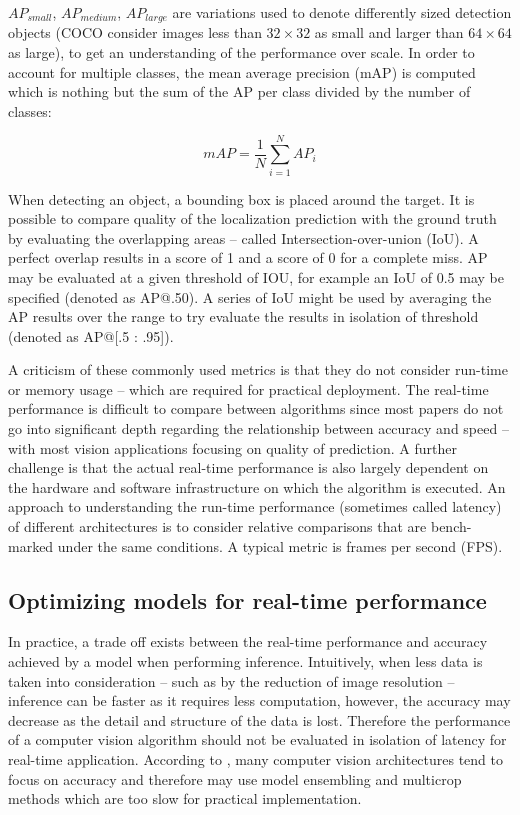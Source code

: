 \documentclass[a4paper,twoside,12pt]{report}
\begin{document}
$AP_{small}$, $AP_{medium}$, $AP_{large}$ are variations used to denote differently sized detection objects (COCO consider images less than $32 \times 32$ as small and larger than $64 \times 64$ as large), to get an understanding of the performance over scale. In order to account for multiple classes, the mean average precision (mAP) is computed which is nothing but the sum of the AP per class divided by the number of classes:

\begin{equation}
mAP = \frac{1}{N}\sum_{i=1}^{N} AP_{i}
\end{equation}

When detecting an object, a bounding box is placed around the target. It is possible to compare quality of the localization prediction with the ground truth by evaluating the overlapping areas -- called Intersection-over-union (IoU). A perfect overlap results in a score of 1 and a score of 0 for a complete miss. AP may be evaluated at a given threshold of IOU, for example an IoU of 0.5 may be specified (denoted as AP@.50). A series of IoU might be used by averaging the AP results over the range to try evaluate the results in isolation of threshold (denoted as AP@[.5 : .95]).  \citep{pmetrics}

A criticism of these commonly used metrics is that they do not consider run-time or memory usage -- which are required for practical deployment. The real-time performance is difficult to compare between algorithms since most papers do not go into significant depth regarding the relationship between accuracy and speed \citep{speedacc} -- with most vision applications focusing on quality of prediction. A further challenge is that the actual real-time performance is also largely dependent on the hardware and software infrastructure on which the algorithm is executed. An approach to understanding the run-time performance (sometimes called latency) of different architectures is to consider relative comparisons that are bench-marked under the same conditions. A typical metric is frames per second (FPS).

\newpage
\subsection{Optimizing models for real-time performance}

In practice, a trade off exists between the real-time performance and accuracy achieved by a model when performing inference. Intuitively, when less data is taken into consideration -- such as by the reduction of image resolution -- inference can be faster as it requires less computation, however, the accuracy may decrease as the detail and structure of the data is lost. Therefore the performance of a computer vision algorithm should not be evaluated in isolation of latency for real-time application. According to \cite{speedacc}, many computer vision architectures tend to focus on accuracy and therefore may use model ensembling and multicrop methods which are too slow for practical implementation.
\end{document}
